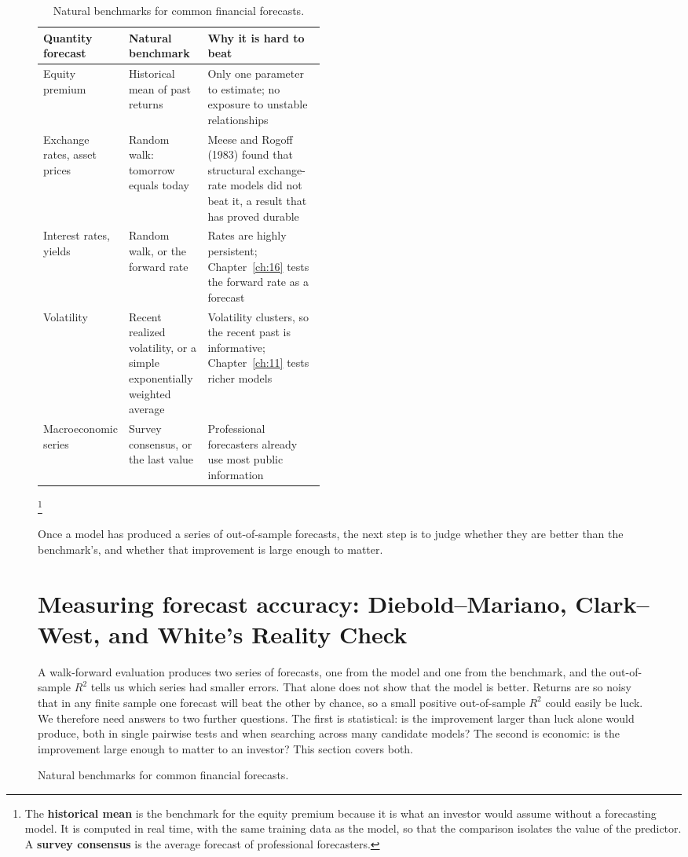 \begin{figure}[htbp]
\begin{table}[htbp]
\centering
\small
\caption{Natural benchmarks for common financial forecasts.}
\label{tab:05-benchmarks}
\begin{tabularx}{0.9\linewidth}{@{}>{\raggedright\arraybackslash}p{0.18\linewidth}>{\raggedright\arraybackslash}p{0.28\linewidth}>{\raggedright\arraybackslash}X@{}}
\toprule
Quantity forecast & Natural benchmark & Why it is hard to beat \\
\midrule
Equity premium & Historical mean of past returns & Only one parameter to estimate; no exposure to unstable relationships \\
Exchange rates, asset prices & Random walk: tomorrow equals today & Meese and Rogoff (1983) found that structural exchange-rate models did not beat it, a result that has proved durable \\
Interest rates, yields & Random walk, or the forward rate & Rates are highly persistent; Chapter~\ref{ch:16} tests the forward rate as a forecast \\
Volatility & Recent realized volatility, or a simple exponentially weighted average & Volatility clusters, so the recent past is informative; Chapter~\ref{ch:11} tests richer models \\
Macroeconomic series & Survey consensus, or the last value & Professional forecasters already use most public information \\
\bottomrule
\end{tabularx}
\end{table}
\footnote{The \textbf{historical mean} is the benchmark for the equity premium because it is what an investor would assume without a forecasting model. It is computed in real time, with the same training data as the model, so that the comparison isolates the value of the predictor. 
A \textbf{survey consensus} is the average forecast of professional forecasters.}

Once a model has produced a series of out-of-sample forecasts, the next step is to judge whether they are better than the benchmark's, and whether that improvement is large enough to matter.

\section{Measuring forecast accuracy: Diebold--Mariano, Clark--West, and White's Reality Check}
\label{sec:05-accuracy}

A walk-forward evaluation produces two series of forecasts, one from the model and one from the benchmark, and the out-of-sample $R^2$ tells us which series had smaller errors. That alone does not show that the model is better. Returns are so noisy that in any finite sample one forecast will beat the other by chance, so a small positive out-of-sample $R^2$ could easily be luck. We therefore need answers to two further questions. The first is statistical: is the improvement larger than luck alone would produce, both in single pairwise tests and when searching across many candidate models? The second is economic: is the improvement large enough to matter to an investor? This section covers both.


\end{figure}
